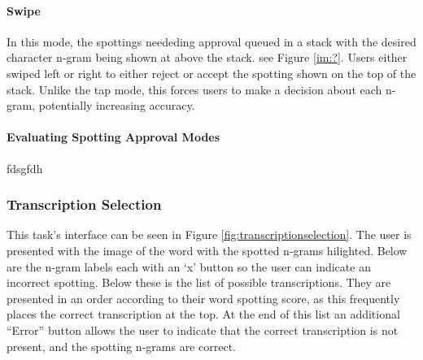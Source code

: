 \documentclass[ms,electronic,twosidetoc,letterpaper,chaptercenter,parttop,lol,lof,lot]{byumsphd}
\begin{document}
\paragraph{Swipe}
In this mode, the spottings neededing approval queued in a stack with the desired character n-gram being shown at above the stack. see Figure \ref{im:?}. Users either swiped left or right to either reject or accept the spotting shown on the top of the stack. Unlike the tap mode, this forces users to make a decision about each n-gram, potentially increasing accuracy.


\paragraph{Evaluating Spotting Approval Modes}

fdsgfdh
\fi

\subsubsection{Transcription Selection}\label{transtask}
This task's interface can be seen in Figure \ref{fig:transcriptionselection}.
The user is presented with the image of the word with the spotted n-grams hilighted. Below are the n-gram labels each with an `x' button so the user can indicate an incorrect spotting.
Below these is the list of possible transcriptions. They are presented in an order according to their word spotting score, as this frequently places the correct transcription at the top.
At the end of this list an additional ``Error'' button allows the user to indicate that the correct transcription is not present, and the spotting n-grams are correct.
\end{document}
